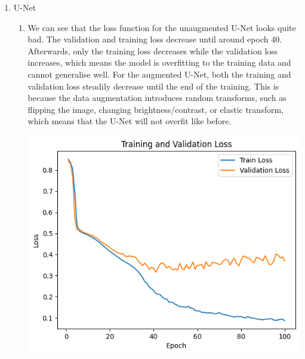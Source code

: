 \documentclass[
    a4paper,
    12pt,
    parskip=half,
]{scrarticle}
\begin{document}
\begin{enumerate}
\begin{enumerate}[label=\theenumi.\arabic*.]
        \item U-Net
        \begin{enumerate}[label=\alph*)]
            \item We can see that the loss function for the unaugmented U-Net looks quite bad.
            The validation and training loss decrease until around epoch 40.
            Afterwards, only the training loss decreases while the validation loss increases, which means the model is overfitting to the training data and cannot generalise well.
            For the augmented U-Net, both the training and validation loss steadily decrease until the end of the training.
            This is because the data augmentation introduces random transforms, such as flipping the image, changing brightness/contrast, or elastic transform, which means that the U-Net will not overfit like before.\\
            \begin{minipage}{\linewidth}
                \centering
                \begin{minipage}{0.5\linewidth}
                    \includegraphics[width=\linewidth]{unet_loss}
                    \label{fig:unet_loss}
                \end{minipage}%
                \begin{minipage}{0.5\linewidth}

\end{minipage}
\end{minipage}
\end{enumerate}
\end{enumerate}
\end{enumerate}
\end{document}
